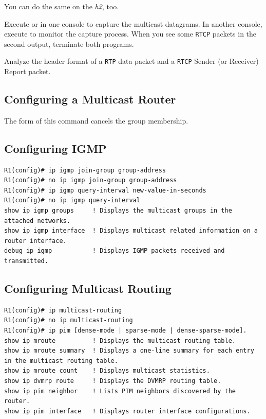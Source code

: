 \documentclass{../UTNetLab}
\begin{document}
You can do the same on the \textit{h2}, too.

Execute  or  in one console to capture the multicast datagrams.
In another console, execute  to monitor the capture process.
When you see some \texttt{RTCP} packets in the second  output, terminate both  programs.

\begin{report}
    \item Analyze the header format of a \texttt{RTP} data packet and a \texttt{RTCP} Sender (or Receiver) Report packet.
\end{report}

\clearpage
\begin{appendices}

    \section{Configuring a Multicast Router}
    The  form of this command cancels the group membership.

    \begin{subappendices}
        \subsection{Configuring IGMP}
        \begin{lstlisting}[language={cisco}, emph={group-address, new-value-in-seconds}]
R1(config)# ip igmp join-group group-address
R1(config)# no ip igmp join-group group-address
R1(config)# ip igmp query-interval new-value-in-seconds
R1(config)# no ip igmp query-interval
show ip igmp groups     ! Displays the multicast groups in the attached networks.
show ip igmp interface  ! Displays multicast related information on a router interface.
debug ip igmp           ! Displays IGMP packets received and transmitted.
    \end{lstlisting}

        \subsection{Configuring Multicast Routing}
        \begin{lstlisting}[language={cisco}]
R1(config)# ip multicast-routing
R1(config)# no ip multicast-routing
R1(config)# ip pim [dense-mode | sparse-mode | dense-sparse-mode].
show ip mroute          ! Displays the multicast routing table.
show ip mroute summary  ! Displays a one-line summary for each entry in the multicast routing table.
show ip mroute count    ! Displays multicast statistics.
show ip dvmrp route     ! Displays the DVMRP routing table.
show ip pim neighbor    ! Lists PIM neighbors discovered by the router.
show ip pim interface   ! Displays router interface configurations.
    \end{lstlisting}


\end{subappendices}
\end{appendices}
\end{document}
